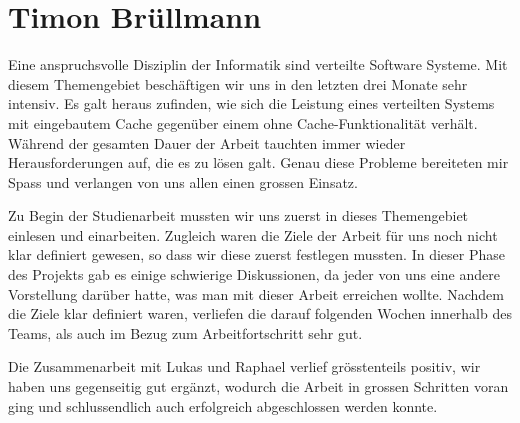 \section{Timon Brüllmann}

Eine anspruchsvolle Disziplin der Informatik sind verteilte Software Systeme. Mit diesem Themengebiet beschäftigen wir uns in den letzten drei Monate sehr intensiv. Es galt heraus zufinden, wie sich die Leistung eines verteilten Systems mit eingebautem Cache gegenüber einem ohne Cache-Funktionalität verhält. Während der gesamten Dauer der Arbeit tauchten immer wieder Herausforderungen auf, die es zu lösen galt. Genau diese Probleme bereiteten mir Spass und verlangen von uns allen einen grossen Einsatz.


Zu Begin der Studienarbeit mussten wir uns zuerst in dieses Themengebiet einlesen und einarbeiten. Zugleich waren die Ziele der Arbeit für uns noch nicht klar definiert gewesen, so dass wir diese zuerst festlegen mussten. In dieser Phase des Projekts gab es einige schwierige Diskussionen, da jeder von uns eine andere Vorstellung darüber hatte, was man mit dieser Arbeit erreichen wollte. Nachdem die Ziele klar definiert waren, verliefen die darauf folgenden Wochen innerhalb des Teams, als auch im Bezug zum Arbeitfortschritt sehr gut.  


Die Zusammenarbeit mit Lukas und Raphael verlief grösstenteils positiv, wir haben uns gegenseitig gut ergänzt, wodurch die Arbeit in grossen Schritten voran ging und schlussendlich auch erfolgreich abgeschlossen werden konnte.

